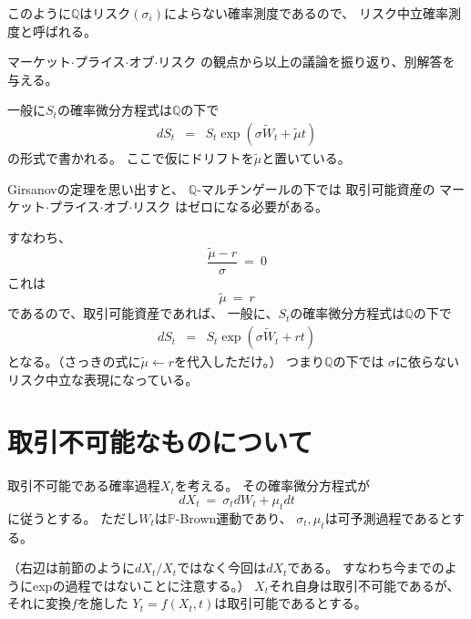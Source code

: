 \documentclass[uplatex,a4j,12pt,dvipdfmx]{jsarticle}
\begin{document}
このように$\mathbb{Q}$はリスク$(\sigma_{i})$によらない確率測度であるので、
リスク中立確率測度と呼ばれる。
${}$

マーケット$\cdot$プライス$\cdot$オブ$\cdot$リスク
の観点から以上の議論を振り返り、別解答を与える。

一般に$S_{t}$の確率微分方程式は$\mathbb{Q}$の下で
%
%
\begin{eqnarray*}
	d S_{t}
	&=&
	S_{t} \exp \left(
	\sigma \tilde{W}_{t}
	+ \tilde{\mu} t
	\right)
\end{eqnarray*}
%
%
の形式で書かれる。
ここで仮にドリフトを$\tilde{\mu}$と置いている。

Girsanovの定理を思い出すと、
$\mathbb{Q}$-マルチンゲールの下では
取引可能資産の
マーケット$\cdot$プライス$\cdot$オブ$\cdot$リスク
はゼロになる必要がある。

すなわち、
$$
	\dfrac{\tilde{\mu} - r}{ \sigma }
	\ = \
	0
$$
これは
$$
	\tilde{\mu} \ = \ r
$$
であるので、取引可能資産であれば、
一般に、$S_{t}$の確率微分方程式は$\mathbb{Q}$の下で
%
%
\begin{eqnarray*}
	d S_{t}
	&=&
	S_{t} \exp \left(
	\sigma \tilde{W}_{t}
	+ r t
	\right)
\end{eqnarray*}
%
%
となる。（さっきの式に$\tilde{\mu} \leftarrow r$を代入しただけ。）
つまり$\mathbb{Q}$の下では
$\sigma$に依らないリスク中立な表現になっている。

\section*{取引不可能なものについて}

取引不可能である確率過程$X_{t}$を考える。
その確率微分方程式が
$$
	d X_{t}
	\ = \
	\sigma_{t} d W_{t} + \mu_{t} dt
$$
に従うとする。
ただし$W_{t}$は$\mathbb{P}$-Brown運動であり、
$\sigma_{t},\mu_{t}$は可予測過程であるとする。

（右辺は前節のように$dX_{t}/X_{t}$ではなく今回は$dX_{t}$である。
すなわち今までのようにexpの過程ではないことに注意する。）
$X_{t}$それ自身は取引不可能であるが、
それに変換$f$を施した
$Y_{t}=f(X_{t},t)$は取引可能であるとする。
\end{document}
